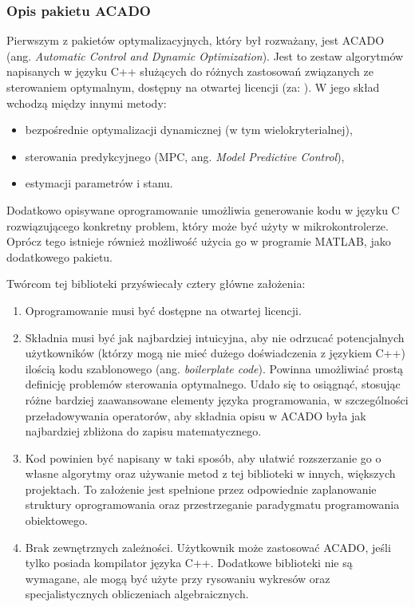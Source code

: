 \subsubsection{Opis pakietu ACADO}

Pierwszym z pakietów optymalizacyjnych, który był rozważany, jest ACADO (ang. \emph{Automatic Control and Dynamic
Optimization}). Jest to zestaw algorytmów napisanych w języku C++ służących do różnych zastosowań związanych ze sterowaniem optymalnym, dostępny na otwartej licencji (za: \cite{Houska2011}). W jego skład wchodzą między innymi metody:
\begin{itemize}
    \item bezpośrednie optymalizacji dynamicznej (w tym wielokryterialnej),
    \item sterowania predykcyjnego (MPC, ang. \emph{Model Predictive Control}),
    \item estymacji parametrów i stanu.
\end{itemize}

Dodatkowo opisywane oprogramowanie umożliwia generowanie kodu w języku C rozwiązującego konkretny problem, który może być użyty w mikrokontrolerze. Oprócz tego istnieje również możliwość użycia go w programie MATLAB, jako dodatkowego pakietu.

Twórcom tej biblioteki przyświecały cztery główne założenia:
\begin{enumerate}
    \item Oprogramowanie musi być dostępne na otwartej licencji.
    \item Składnia musi być jak najbardziej intuicyjna, aby nie odrzucać potencjalnych użytkowników (którzy mogą nie mieć dużego doświadczenia z językiem C++) ilością kodu szablonowego (ang. \emph{boilerplate code}). Powinna umożliwiać prostą definicję problemów sterowania optymalnego. Udało się to osiągnąć, stosując różne bardziej zaawansowane elementy języka programowania, w szczególności przeładowywania operatorów, aby składnia opisu w ACADO była jak najbardziej zbliżona do zapisu matematycznego.
    \item Kod powinien być napisany w taki sposób, aby ułatwić rozszerzanie go o własne algorytmy oraz używanie metod z tej biblioteki w innych, większych projektach. To założenie jest spełnione przez odpowiednie zaplanowanie struktury oprogramowania oraz przestrzeganie paradygmatu programowania obiektowego.
    \item Brak zewnętrznych zależności. Użytkownik może zastosować ACADO, jeśli tylko posiada kompilator języka C++. Dodatkowe biblioteki nie są wymagane, ale mogą być użyte przy rysowaniu wykresów oraz specjalistycznych obliczeniach algebraicznych.
\end{enumerate}

